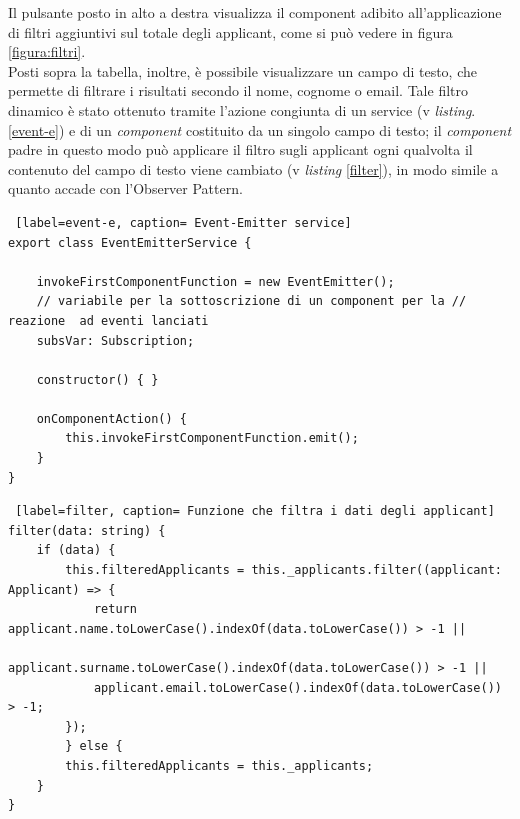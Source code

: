 Il pulsante posto in alto a destra visualizza il component adibito all'applicazione di filtri aggiuntivi sul totale degli applicant, come si può vedere in figura \ref{figura:filtri}.\\
Posti sopra la tabella, inoltre, è possibile visualizzare un campo di testo, che permette di filtrare i risultati secondo il nome, cognome o email. Tale filtro dinamico è stato ottenuto tramite l'azione congiunta di un service (v \textit{listing}. \ref{event-e}) e di un \textit{component} costituito da un singolo campo di testo; il \textit{component} padre in questo modo può applicare il filtro sugli applicant ogni qualvolta il contenuto del campo di testo viene cambiato (v \textit{listing} \ref{filter}), in modo simile a quanto accade con l'\gls{Observer Pattern}.

\begin{lstlisting} [label=event-e, caption= Event-Emitter service]
export class EventEmitterService {

	invokeFirstComponentFunction = new EventEmitter();
	// variabile per la sottoscrizione di un component per la // reazione  ad eventi lanciati
	subsVar: Subscription;

	constructor() { }

	onComponentAction() {
		this.invokeFirstComponentFunction.emit();
	}
}
\end{lstlisting}

\begin{lstlisting} [label=filter, caption= Funzione che filtra i dati degli applicant]
filter(data: string) {
	if (data) {
		this.filteredApplicants = this._applicants.filter((applicant: Applicant) => {
			return applicant.name.toLowerCase().indexOf(data.toLowerCase()) > -1 ||
			applicant.surname.toLowerCase().indexOf(data.toLowerCase()) > -1 ||
			applicant.email.toLowerCase().indexOf(data.toLowerCase()) > -1;
		});
		} else {
		this.filteredApplicants = this._applicants;
	}
}

\end{lstlisting}


